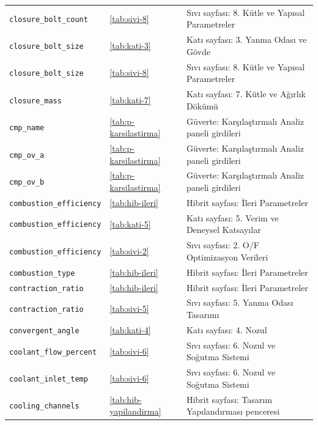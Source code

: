 \documentclass[11pt,a4paper]{article}
\begin{document}
{\begin{longtable}{@{}>{\raggedright\arraybackslash}p{5.2cm}p{1.4cm}>{\raggedright\arraybackslash}p{7.4cm}@{}}
\texttt{closure\_\allowbreak{}bolt\_\allowbreak{}count} & \ref{tab:sivi-8} & Sıvı sayfası: 8. Kütle ve Yapısal Parametreler \\
\texttt{closure\_\allowbreak{}bolt\_\allowbreak{}size} & \ref{tab:kati-3} & Katı sayfası: 3. Yanma Odası ve Gövde \\
\texttt{closure\_\allowbreak{}bolt\_\allowbreak{}size} & \ref{tab:sivi-8} & Sıvı sayfası: 8. Kütle ve Yapısal Parametreler \\
\texttt{closure\_\allowbreak{}mass} & \ref{tab:kati-7} & Katı sayfası: 7. Kütle ve Ağırlık Dökümü \\
\texttt{cmp\_\allowbreak{}name} & \ref{tab:p-karsilastirma} & Güverte: Karşılaştırmalı Analiz paneli girdileri \\
\texttt{cmp\_\allowbreak{}ov\_\allowbreak{}a} & \ref{tab:p-karsilastirma} & Güverte: Karşılaştırmalı Analiz paneli girdileri \\
\texttt{cmp\_\allowbreak{}ov\_\allowbreak{}b} & \ref{tab:p-karsilastirma} & Güverte: Karşılaştırmalı Analiz paneli girdileri \\
\texttt{combustion\_\allowbreak{}efficiency} & \ref{tab:hib-ileri} & Hibrit sayfası: İleri Parametreler \\
\texttt{combustion\_\allowbreak{}efficiency} & \ref{tab:kati-5} & Katı sayfası: 5. Verim ve Deneysel Katsayılar \\
\texttt{combustion\_\allowbreak{}efficiency} & \ref{tab:sivi-2} & Sıvı sayfası: 2. O/F Optimizasyon Verileri \\
\texttt{combustion\_\allowbreak{}type} & \ref{tab:hib-ileri} & Hibrit sayfası: İleri Parametreler \\
\texttt{contraction\_\allowbreak{}ratio} & \ref{tab:hib-ileri} & Hibrit sayfası: İleri Parametreler \\
\texttt{contraction\_\allowbreak{}ratio} & \ref{tab:sivi-5} & Sıvı sayfası: 5. Yanma Odası Tasarımı \\
\texttt{convergent\_\allowbreak{}angle} & \ref{tab:kati-4} & Katı sayfası: 4. Nozul \\
\texttt{coolant\_\allowbreak{}flow\_\allowbreak{}percent} & \ref{tab:sivi-6} & Sıvı sayfası: 6. Nozul ve Soğutma Sistemi \\
\texttt{coolant\_\allowbreak{}inlet\_\allowbreak{}temp} & \ref{tab:sivi-6} & Sıvı sayfası: 6. Nozul ve Soğutma Sistemi \\
\texttt{cooling\_\allowbreak{}channels} & \ref{tab:hib-yapilandirma} & Hibrit sayfası: Tasarım Yapılandırması penceresi \\

\end{longtable}}
\end{document}

